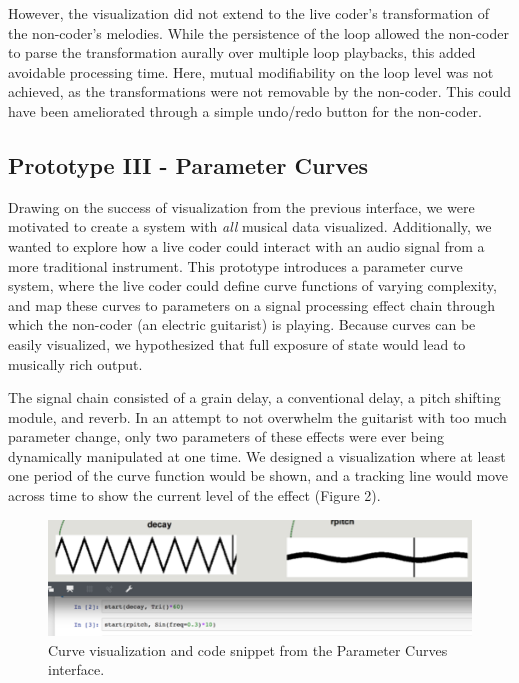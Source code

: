 \documentclass{nime-alternate}
\begin{document}
However, the visualization did not extend to the live coder's transformation of the non-coder's melodies. While the persistence of the loop allowed the non-coder to parse the transformation aurally over multiple loop playbacks, this added avoidable processing time. Here, mutual modifiability on the loop level was not achieved, as the transformations were not removable by the non-coder. This could have been ameliorated through a simple undo/redo button for the non-coder.

\subsection{Prototype III - Parameter Curves}
Drawing on the success of visualization from the previous interface, we were motivated to create a system with \textit{all} musical data visualized. Additionally, we wanted to explore how a live coder could interact with an audio signal from a more traditional instrument. This prototype introduces a parameter curve system, where the live coder could define curve functions of varying complexity, and map these curves to parameters on a signal processing effect chain through which the non-coder (an electric guitarist) is playing. Because curves can be easily visualized, we hypothesized that full exposure of state would lead to musically rich output. 

The signal chain consisted of a grain delay, a conventional delay, a pitch shifting module, and reverb. In an attempt to not overwhelm the guitarist with too much parameter change, only two parameters of these effects were ever being dynamically manipulated at one time. We designed a visualization where at least one period of the curve function would be shown, and a tracking line would move across time to show the current level of the effect (Figure 2).

\begin{figure}[htbp]
	\centering
		\includegraphics[width=1\columnwidth]{CurveVisualization}
	\caption{Curve visualization and code snippet from the Parameter Curves interface.}
	\label{fig:CurveVisualization}
\end{figure}
\end{document}
